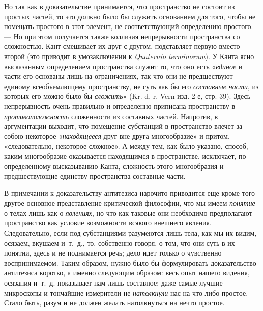Но так как в доказательстве принимается, что пространство не состоит из
простых частей, то это должно было бы служить основанием для того, чтобы не
помещать простого в этот элемент, не соответствующий определению простого.
— Но при этом получается также коллизия непрерывности пространства со
сложностью. Кант смешивает их друг с другом, подставляет первую вместо
второй (это приводит в умозаключении к {\em Quaternio
terminorum}). У Канта ясно высказанным определением пространства служит то,
что оно есть «{\em единое} и части его основаны лишь на
ограничениях, так что они не предшествуют единому всеобъемлющему
пространству, не суть как бы его {\em составные части},
из которых его можно было бы {\em сложить}» (Kr. d. r.
Vern изд. 2-е, стр. 39). Здесь непрерывность очень правильно и определенно
приписана пространству в {\em противоположность}
сложенности из составных частей. Напротив, в аргументации выходит, что
помещение субстанций в пространство влечет за собою некоторое
«{\em находящееся} друг вне друга многообразие» и
притом, «следовательно, некоторое сложное». А между тем, как было указано,
способ, каким многообразие оказывается находящимся в пространстве,
исключает, по определенному высказыванию Канта, сложность этого
многообразия и предшествующие единству пространства составные части.

В примечании к доказательству антитезиса нарочито приводится еще кроме того
другое основное представление критической философии, что мы имеем
{\em понятие} о телах лишь как о
{\em явлениях}, но что как таковые они необходимо
предполагают пространство как условие возможности всякого внешнего явления.
Следовательно, если под субстанциями разумеются лишь тела, как мы их видим,
осязаем, вкушаем и~т.~д., то, собственно говоря, о том, что они суть в их
понятии, здесь и не поднимается речь; дело идет только о чувственно
воспринимаемом. Таким образом, нужно было бы формулировать доказательство
антитезиса коротко, а именно следующим образом: весь опыт нашего видения,
осязания и~т.~д. показывает нам лишь составное; даже самые лучшие
микроскопы и тончайшие измерители не {\em натолкнули}
нас на что-либо простое. Стало быть, разум и не должен желать натолкнуться
на нечто простое.

